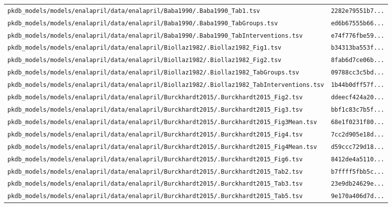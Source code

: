 \begin{longtable}{ll}
\texttt{pkdb\_models/models/enalapril/data/enalapril/Baba1990/.Baba1990\_Tab1.tsv} & \texttt{2282e79551b7...} \\
\texttt{pkdb\_models/models/enalapril/data/enalapril/Baba1990/.Baba1990\_TabGroups.tsv} & \texttt{ed6b67555b66...} \\
\texttt{pkdb\_models/models/enalapril/data/enalapril/Baba1990/.Baba1990\_TabInterventions.tsv} & \texttt{e74f776fbe59...} \\
\texttt{pkdb\_models/models/enalapril/data/enalapril/Biollaz1982/.Biollaz1982\_Fig1.tsv} & \texttt{b34313ba553f...} \\
\texttt{pkdb\_models/models/enalapril/data/enalapril/Biollaz1982/.Biollaz1982\_Fig2.tsv} & \texttt{8fab6d7ce06b...} \\
\texttt{pkdb\_models/models/enalapril/data/enalapril/Biollaz1982/.Biollaz1982\_TabGroups.tsv} & \texttt{09788cc3c5bd...} \\
\texttt{pkdb\_models/models/enalapril/data/enalapril/Biollaz1982/.Biollaz1982\_TabInterventions.tsv} & \texttt{1b44b0dff57f...} \\
\texttt{pkdb\_models/models/enalapril/data/enalapril/Burckhardt2015/.Burckhardt2015\_Fig2.tsv} & \texttt{ddeecf424a20...} \\
\texttt{pkdb\_models/models/enalapril/data/enalapril/Burckhardt2015/.Burckhardt2015\_Fig3.tsv} & \texttt{bbf1c83c7b5f...} \\
\texttt{pkdb\_models/models/enalapril/data/enalapril/Burckhardt2015/.Burckhardt2015\_Fig3Mean.tsv} & \texttt{68e1f0231f80...} \\
\texttt{pkdb\_models/models/enalapril/data/enalapril/Burckhardt2015/.Burckhardt2015\_Fig4.tsv} & \texttt{7cc2d905e18d...} \\
\texttt{pkdb\_models/models/enalapril/data/enalapril/Burckhardt2015/.Burckhardt2015\_Fig4Mean.tsv} & \texttt{d59ccc729d18...} \\
\texttt{pkdb\_models/models/enalapril/data/enalapril/Burckhardt2015/.Burckhardt2015\_Fig6.tsv} & \texttt{8412de4a5110...} \\
\texttt{pkdb\_models/models/enalapril/data/enalapril/Burckhardt2015/.Burckhardt2015\_Tab2.tsv} & \texttt{b7ffff5fbb5c...} \\
\texttt{pkdb\_models/models/enalapril/data/enalapril/Burckhardt2015/.Burckhardt2015\_Tab3.tsv} & \texttt{23e9db24629e...} \\
\texttt{pkdb\_models/models/enalapril/data/enalapril/Burckhardt2015/.Burckhardt2015\_Tab5.tsv} & \texttt{9e170a406d7d...} \\

\end{longtable}
